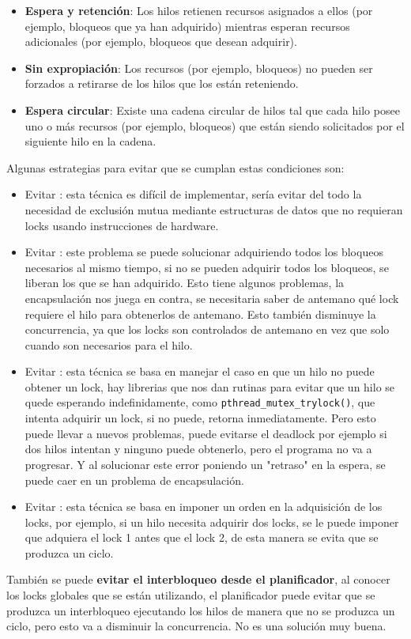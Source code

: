 \documentclass[openany]{book}
\begin{document}
\begin{itemize}
\begin{itemize}
        \item \textbf{Espera y retención}: Los hilos retienen recursos asignados a ellos (por ejemplo, bloqueos que ya han adquirido) mientras esperan recursos adicionales (por ejemplo, bloqueos que desean adquirir).
        \item \textbf{Sin expropiación}: Los recursos (por ejemplo, bloqueos) no pueden ser forzados a retirarse de los hilos que los están reteniendo.
        \item \textbf{Espera circular}: Existe una cadena circular de hilos tal que cada hilo posee uno o más recursos (por ejemplo, bloqueos) que están siendo solicitados por el siguiente hilo en la cadena.
    \end{itemize}
    Algunas estrategias para evitar que se cumplan estas condiciones son:
    \begin{itemize}
        \item Evitar : esta técnica es difícil de implementar, sería evitar del todo la necesidad de exclusión mutua mediante estructuras de datos que no requieran locks usando instrucciones de hardware.
        \item Evitar : este problema se puede solucionar adquiriendo todos los bloqueos necesarios al mismo tiempo, si no se pueden adquirir todos los bloqueos, se liberan los que se han adquirido. Esto tiene algunos problemas, la encapsulación nos juega en contra, se necesitaria saber de antemano qué lock requiere el hilo para obtenerlos de antemano. Esto también disminuye la concurrencia, ya que los locks son controlados de antemano en vez que solo cuando son necesarios para el hilo.
        \item Evitar : esta técnica se basa en manejar el caso en que un hilo no puede obtener un lock, hay librerias que nos dan rutinas para evitar que un hilo se quede esperando indefinidamente, como \texttt{pthread\_mutex\_trylock()}, que intenta adquirir un lock, si no puede, retorna inmediatamente. Pero esto puede llevar a nuevos problemas, puede evitarse el deadlock por ejemplo si dos hilos intentan y ninguno puede obtenerlo, pero el programa no va a progresar. Y al solucionar este error poniendo un "retraso" en la espera, se puede caer en un problema de encapsulación.
        \item Evitar : esta técnica se basa en imponer un orden en la adquisición de los locks, por ejemplo, si un hilo necesita adquirir dos locks, se le puede imponer que adquiera el lock 1 antes que el lock 2, de esta manera se evita que se produzca un ciclo.
    \end{itemize}
    También se puede \textbf{evitar el interbloqueo desde el planificador}, al conocer los locks globales que se están utilizando, el planificador puede evitar que se produzca un interbloqueo ejecutando los hilos de manera que no se produzca un ciclo, pero esto va a disminuir la concurrencia. No es una solución muy buena.


\end{itemize}
\end{document}
